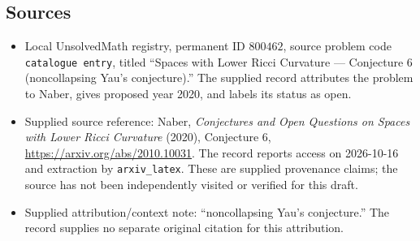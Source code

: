 \documentclass[11pt]{article}
\begin{document}
\subsection{Sources}
\begin{itemize}
\item Local UnsolvedMath registry, permanent ID \(800462\), source problem code \texttt{catalogue entry}, titled ``Spaces with Lower Ricci Curvature --- Conjecture 6 (noncollapsing Yau's conjecture).'' The supplied record attributes the problem to Naber, gives proposed year 2020, and labels its status as open.
\item Supplied source reference: Naber, \emph{Conjectures and Open Questions on Spaces with Lower Ricci Curvature} (2020), Conjecture 6, \url{https://arxiv.org/abs/2010.10031}. The record reports access on 2026-10-16 and extraction by \texttt{arxiv\_latex}. These are supplied provenance claims; the source has not been independently visited or verified for this draft.
\item Supplied attribution/context note: ``noncollapsing Yau's conjecture.'' The record supplies no separate original citation for this attribution.
\end{itemize}
\end{document}
